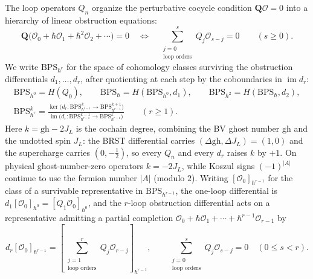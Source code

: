 \documentclass[11pt]{article}
\numberwithin{equation}{section}
\numberwithin{figure}{section}
\numberwithin{table}{section}
\begin{document}
The loop operators $Q_n$ organize the perturbative cocycle condition $\mathbf Q\mathcal O=0$ into a hierarchy of linear obstruction equations:
\begin{equation}\label{eq-liftingequations}
\mathbf Q\bigl(\mathcal O_0+\hbar\mathcal O_1+\hbar^2\mathcal O_2+\cdots\bigr)=0
\quad\Longleftrightarrow\quad
\sum_{\substack{j=0\\\text{loop orders}}}^{s}Q_j\mathcal O_{s-j}=0
\qquad(s\ge0).
\end{equation}
We write $\mathrm{BPS}_{\hbar^r}$ for the space of cohomology classes surviving the obstruction differentials $d_1,\ldots,d_r$, after quotienting at each step by the coboundaries in $\operatorname{im}d_r$:
\begin{equation}\label{eq-page-iterated}
\begin{gathered}
\mathrm{BPS}_{\hbar^0}=H(Q_0),\qquad
\mathrm{BPS}_{\hbar}=H(\mathrm{BPS}_{\hbar^0},d_1),\qquad
\mathrm{BPS}_{\hbar^2}=H(\mathrm{BPS}_{\hbar},d_2),\\
\mathrm{BPS}_{\hbar^r}^{k}
=\frac{\ker\bigl(d_r:\mathrm{BPS}_{\hbar^{r-1}}^{k}\to\mathrm{BPS}_{\hbar^{r-1}}^{k+1}\bigr)}
{\operatorname{im}\bigl(d_r:\mathrm{BPS}_{\hbar^{r-1}}^{k-1}\to\mathrm{BPS}_{\hbar^{r-1}}^{k}\bigr)}
\qquad(r\ge1).
\end{gathered}
\end{equation}
Here $k=\mathrm{gh}-2J_L$ is the cochain degree, combining the BV ghost number $\mathrm{gh}$ and the undotted spin $J_L$: the BRST differential carries $(\Delta\mathrm{gh},\Delta J_L)=(1,0)$ and the supercharge carries $(0,-\tfrac12)$, so every $Q_n$ and every $d_r$ raises $k$ by $+1$. On physical ghost-number-zero operators $k=-2J_L$, while Koszul signs $(-1)^{|A|}$ continue to use the fermion number $|A|$ (modulo $2$).
Writing $[\mathcal O_0]_{\hbar^{r-1}}$ for the class of a survivable representative in $\mathrm{BPS}_{\hbar^{r-1}}$, the one-loop differential is $d_1[\mathcal O_0]_{\hbar^0}=[Q_1\mathcal O_0]_{\hbar^0}$, and the $r$-loop obstruction differential acts on a representative admitting a partial completion $\mathcal O_0+\hbar\mathcal O_1+\cdots+\hbar^{r-1}\mathcal O_{r-1}$ by
\begin{equation}\label{local-ch8-obstruction-definition}
d_r[\mathcal O_0]_{\hbar^{r-1}}=
\left[\sum_{\substack{j=1\\\text{loop orders}}}^{r}Q_j\mathcal O_{r-j}\right]_{\hbar^{r-1}},
\qquad
\sum_{\substack{j=0\\\text{loop orders}}}^{s}Q_j\mathcal O_{s-j}=0\quad(0\le s<r).
\end{equation}
\end{document}
